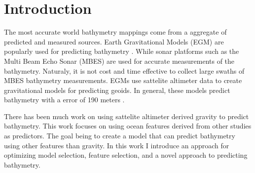 
\section{Introduction}
\setlength{\parindent}{10ex}
The most accurate world bathymetry mappings come from a aggregate of predicted and measured sources. 
Earth Gravitational Models (EGM) are popularly used for predicting bathymetry \cite{becker2009global}\cite{smith1994bathymetric}\cite{smith1997global}\cite{smith2010planning}.
While sonar platforms such as the Multi Beam Echo Sonar (MBES) \cite{farr1980multibeam} are used for accurate measurements of the bathymetry.
Naturaly, it is not cost and time effective to collect large swaths of MBES bathymetry measurements.
EGMs use sattelite altimeter data to create gravitational models for predicting geoids.
In general, these models predict bathymetry with a error of 190 meters \cite{jena2012prediction}.

\par
There has been much work on using sattelite altimeter derived gravity to predict bathymetry.
This work focuses on using ocean features derived from other studies as predictors.
The goal being to create a model that can predict bathymetry using other features than gravity.
In this work I introduce an approach for optimizing model selection, feature selection, and a novel approach to predicting bathymetry.